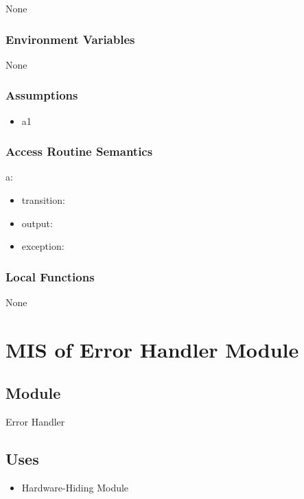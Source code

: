 \documentclass[12pt, titlepage]{article}
\begin{document}
None

\subsubsection{Environment Variables}

None

\subsubsection{Assumptions}

\begin{itemize}
\item a1
\end{itemize}

\subsubsection{Access Routine Semantics}

\noindent a:
\begin{itemize}
\item transition: 
\item output: 
\item exception: 
\end{itemize}

\subsubsection{Local Functions}

None

\newpage

\section{MIS of Error Handler Module} \label{MIS_ERROR}

\subsection{Module}

Error Handler

\subsection{Uses}

\begin{itemize}
\item Hardware-Hiding Module
\end{itemize}
\end{document}
